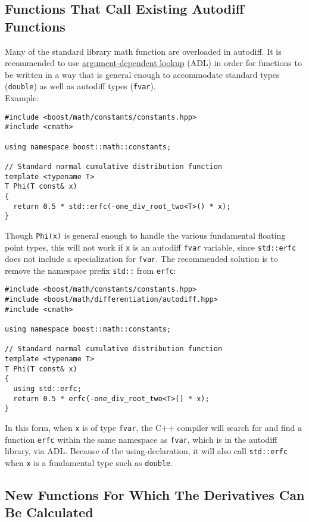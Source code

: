 \documentclass{article}
\begin{document}
\subsection{Functions That Call Existing Autodiff Functions}

Many of the standard library math function are overloaded in autodiff. It is recommended to use
\href{https://en.cppreference.com/w/cpp/language/adl}{argument-dependent lookup} (ADL) in order for functions to
be written in a way that is general enough to accommodate standard types ({\tt double}) as well as autodiff types
({\tt fvar}).
\\
Example:
\begin{Verbatim}[xleftmargin=2em]
#include <boost/math/constants/constants.hpp>
#include <cmath>

using namespace boost::math::constants;

// Standard normal cumulative distribution function
template <typename T>
T Phi(T const& x)
{
  return 0.5 * std::erfc(-one_div_root_two<T>() * x);
}
\end{Verbatim}
Though {\tt Phi(x)} is general enough to handle the various fundamental floating point types, this will
not work if {\tt x} is an autodiff {\tt fvar} variable, since {\tt std::erfc} does not include a specialization
for {\tt fvar}. The recommended solution is to remove the namespace prefix {\tt std::} from {\tt erfc}:
\begin{Verbatim}[xleftmargin=2em]
#include <boost/math/constants/constants.hpp>
#include <boost/math/differentiation/autodiff.hpp>
#include <cmath>

using namespace boost::math::constants;

// Standard normal cumulative distribution function
template <typename T>
T Phi(T const& x)
{
  using std::erfc;
  return 0.5 * erfc(-one_div_root_two<T>() * x);
}
\end{Verbatim}
In this form, when {\tt x} is of type {\tt fvar}, the C++ compiler will search for and find a function {\tt erfc}
within the same namespace as {\tt fvar}, which is in the autodiff library, via ADL. Because of the using-declaration,
it will also call {\tt std::erfc} when {\tt x} is a fundamental type such as {\tt double}.

\subsection{New Functions For Which The Derivatives Can Be Calculated}\label{new_functions}
\end{document}
